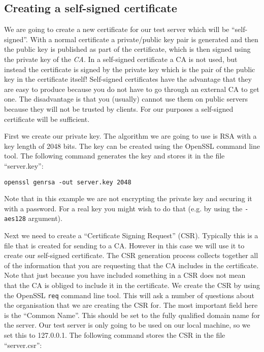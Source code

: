 \subsection {Creating a self-signed certificate}

We are going to create a new certificate for our test server which will be 
``self-signed''. With a normal certificate a private/public key pair is
generated and then the public key is published as part of the certificate, 
which is then signed using the private key of the \emph{CA}. In a self-signed 
certificate a CA is not used, but instead the certificate is signed by the 
private key which is the pair of the public key in the certificate itself! 
Self-signed certificates have the advantage that they are easy to produce 
because you do not have to go through an external CA to get one. The 
disadvantage is that you (usually) cannot use them on public servers because 
they will not be trusted by clients. For our purposes a self-signed certificate 
will be sufficient.

First we create our private key. The algorithm we are going to use is  RSA with
a key length of 2048 bits. The key can be created using the OpenSSL command line
tool. The following command generates the key and stores it in the file 
``server.key'':
\begin{verbatim}
openssl genrsa -out server.key 2048
\end{verbatim}

Note that in this example we are not encrypting the private key and securing it 
with a password. For a real key you might wish to do that (e.g. by using the 
\verb!-aes128! argument).

Next we need to create a ``Certificate Signing Request'' (CSR). Typically this 
is a file that is created for sending to a CA. However in this case we will use 
it to create our self-signed certificate. The CSR generation process collects 
together all of the information that you are requesting that the CA includes in 
the certificate. Note that just because you have included something in a CSR 
does not mean that the CA is obliged to include it in the certificate. We 
create the CSR by using the OpenSSL \verb!req! command line tool. This will ask 
a number of questions about the organisation that we are creating the CSR for. 
The most important field here is the ``Common Name''. This should be set to the 
fully qualified domain name for the server. Our test server is only going to be 
used on our local machine, so we set this to 127.0.0.1. The following command 
stores the CSR in the file ``server.csr'':

